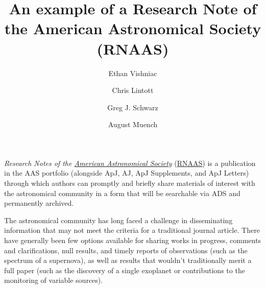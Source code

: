 \documentclass[RNAAS]{aastex62}
\begin{document}
\title{An example of a Research Note of the American Astronomical Society (RNAAS)}


\author{Ethan Vishniac}

\author{Chris Lintott}

\author[0000-0002-0786-7307]{Greg J. Schwarz}

\author{August Muench}


\section{} 

\textit{Research Notes of the \href{https://aas.org}{American Astronomical Society}}
(\href{http://rnaas.aas.org}{RNAAS}) is a publication in the AAS portfolio
(alongside ApJ, AJ, ApJ Supplements, and ApJ Letters) through which authors can 
promptly and briefly share materials of interest with the astronomical community
in a form that will be searchable via ADS and permanently archived.

The astronomical community has long faced a challenge in disseminating
information that may not meet the criteria for a traditional journal article.
There have generally been few options available for sharing works in progress,
comments and clarifications, null results, and timely reports of observations
(such as the spectrum of a supernova), as well as results that wouldn’t
traditionally merit a full paper (such as the discovery of a single exoplanet
or contributions to the monitoring of variable sources). 
\end{document}
